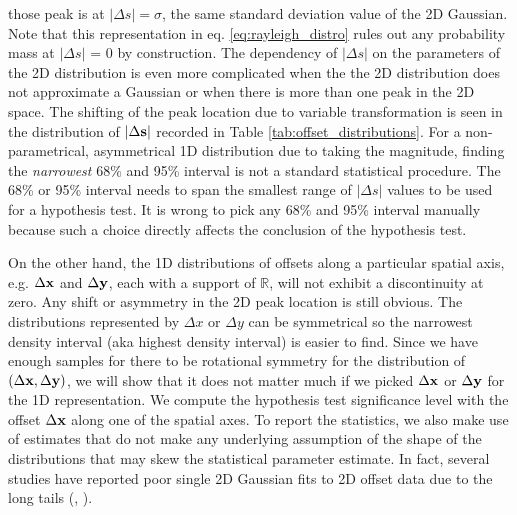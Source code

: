 those peak is at $|\Delta s| = \sigma$, the same standard deviation value of the 2D
Gaussian. Note that this representation in  
eq. \ref{eq:rayleigh_distro}
rules out any probability mass at $|\Delta s|$ = 0 by construction. 
The dependency of $|\Delta s|$ on the parameters of
the 2D distribution is even more
complicated when the the 2D distribution does not approximate a Gaussian 
or when there is more than one peak in the 2D space. 
The shifting of the peak location due to variable transformation 
is seen in the distribution of $|\Delta {\bf s}|$ recorded in Table
\ref{tab:offset_distributions}.
For a non-parametrical, asymmetrical 1D distribution due to taking the magnitude, 
finding the {\it narrowest} 68\% and 95\% interval
is not a standard statistical procedure. The 68\% or 95\% interval needs to
span the smallest range of $|\Delta s|$ values to be used for a hypothesis test.
It is wrong to pick any 68\% and 95\% interval manually because such a choice
directly affects the conclusion of the hypothesis test.

On the other hand, 
the 1D distributions of offsets along a particular spatial axis, 
e.g. $\Delta {\bf x}$ and $\Delta {\bf y}$,
each with a support of $\mathbb{R}$, will not exhibit a discontinuity at zero.
Any shift or asymmetry in the 2D peak location is still obvious. 
The distributions represented by $\Delta x$ or $\Delta y$ 
can be symmetrical so 
the narrowest density interval (aka highest density interval) is easier to find.
Since we have enough samples for there to be
rotational symmetry for the distribution of $(\Delta {\bf x}, \Delta {\bf y})$,
we will show that it does not
matter much if we picked $\Delta {\bf x}$ or $\Delta {\bf y}$ for the 1D representation.
We compute the hypothesis test significance level with the 
 offset $\Delta {\bf x}$ along one of the spatial axes. 
To report the statistics, we also make use of estimates that do not make any
underlying assumption of the shape of the distributions that may skew the
statistical parameter estimate.
In fact, several studies have reported poor single 2D Gaussian fits to 2D offset data
due to the long tails
(\citealt{Zitrin2012a}, \citealt{Oguri2010}).  

